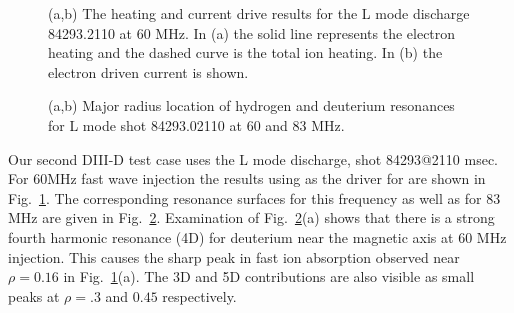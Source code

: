  \begin{figure} %
 \centering  
\begin{narrow}{-0.40in}{0in}  
 \mbox{}
 \caption{(a,b) The heating and current drive results for the  L mode
   discharge 84293.2110  at 60 MHz. In (a) the solid line represents
   the electron heating and the dashed curve is the total ion heating.
   In (b) the electron driven current is shown.}
  \label{l16}
\end{narrow}
 \end{figure}
\begin{figure} %
 \centering  
\begin{narrow}{-0.40in}{0in}  
 \mbox{}
 \caption{(a,b) Major radius location of hydrogen and deuterium
   resonances for L mode shot 84293.02110 at 60 and 83 MHz. }
  \label{l17}
\end{narrow}
 \end{figure}
  Our second DIII-D test case uses the L mode discharge, shot
  84293@2110 msec.  For 60MHz fast
  wave injection  the results using \ot as the driver for \ct are shown
  in Fig.~\ref{l16}. %
  The corresponding resonance surfaces for this frequency as well as
  for 83 MHz are given in Fig.~\ref{l17}. Examination of Fig.~\ref{l17}(a) shows that
  there is a strong fourth harmonic resonance (4D) for deuterium  near the magnetic
  axis at 60 MHz injection. This causes the sharp peak in fast ion
  absorption observed near $\rho = 0.16 $ in Fig.~\ref{l16}(a). The 3D and 5D
  contributions are also visible as small peaks at $\rho = .3$ and $
  0.45 $ respectively.

